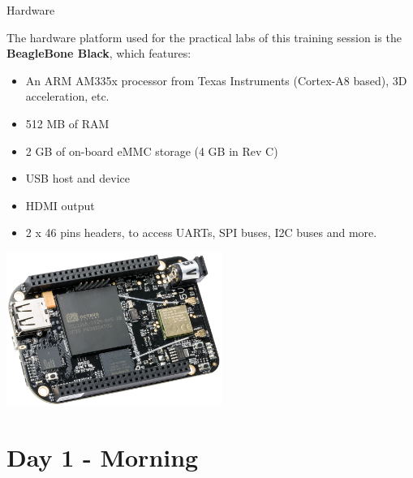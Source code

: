 \documentclass[a4paper,12pt,obeyspaces,spaces,hyphens]{article}
\begin{document}
\feagendatwocolumn
{Hardware}
{
  The hardware platform used for the practical labs of this training
  session is the {\bf BeagleBone Black}, which features:

  \begin{itemize}
  \item An ARM AM335x processor from Texas Instruments (Cortex-A8
    based), 3D acceleration, etc.
  \item 512 MB of RAM
  \item 2 GB of on-board eMMC storage
	\newline(4 GB in Rev C)
  \item USB host and device
  \item HDMI output
  \item 2 x 46 pins headers, to access UARTs, SPI buses, I2C buses
    and more.
  \end{itemize}
}
{}
{
  \begin{center}
    \includegraphics[height=5cm]{../slides/beagleboneblack-board/beagleboneblack.png}
  \end{center}
}

\section{Day 1 - Morning}
\end{document}

